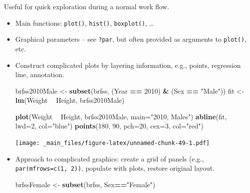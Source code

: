 \documentclass[]{article}
\newenvironment{Shaded}{\begin{snugshade}}{\end{snugshade}}
\newcommand{\KeywordTok}[1]{\textcolor[rgb]{0.13,0.29,0.53}{\textbf{#1}}}
\newcommand{\DataTypeTok}[1]{\textcolor[rgb]{0.13,0.29,0.53}{#1}}
\newcommand{\DecValTok}[1]{\textcolor[rgb]{0.00,0.00,0.81}{#1}}
\newcommand{\StringTok}[1]{\textcolor[rgb]{0.31,0.60,0.02}{#1}}
\newcommand{\OperatorTok}[1]{\textcolor[rgb]{0.81,0.36,0.00}{\textbf{#1}}}
\newcommand{\NormalTok}[1]{#1}
\theoremstyle{definition}
\theoremstyle{definition}
\theoremstyle{remark}
\begin{document}
Useful for quick exploration during a normal work flow.

\begin{itemize}
\item
  Main functions: \texttt{plot()}, \texttt{hist()}, \texttt{boxplot()},
  \ldots{}
\item
  Graphical parameters -- see \texttt{?par}, but often provided as
  arguments to \texttt{plot()}, etc.
\item
  Construct complicated plots by layering information, e.g., points,
  regression line, annotation.

\begin{Shaded}
\begin{Highlighting}[]
\NormalTok{brfss2010Male <-}\StringTok{ }\KeywordTok{subset}\NormalTok{(brfss, (Year }\OperatorTok{==}\StringTok{ }\DecValTok{2010}\NormalTok{) }\OperatorTok{&}\StringTok{ }\NormalTok{(Sex }\OperatorTok{==}\StringTok{ "Male"}\NormalTok{))}
\NormalTok{fit <-}\StringTok{ }\KeywordTok{lm}\NormalTok{(Weight }\OperatorTok{~}\StringTok{ }\NormalTok{Height, brfss2010Male)}

\KeywordTok{plot}\NormalTok{(Weight }\OperatorTok{~}\StringTok{ }\NormalTok{Height, brfss2010Male, }\DataTypeTok{main=}\StringTok{"2010, Males"}\NormalTok{)}
\KeywordTok{abline}\NormalTok{(fit, }\DataTypeTok{lwd=}\DecValTok{2}\NormalTok{, }\DataTypeTok{col=}\StringTok{"blue"}\NormalTok{)}
\KeywordTok{points}\NormalTok{(}\DecValTok{180}\NormalTok{, }\DecValTok{90}\NormalTok{, }\DataTypeTok{pch=}\DecValTok{20}\NormalTok{, }\DataTypeTok{cex=}\DecValTok{3}\NormalTok{, }\DataTypeTok{col=}\StringTok{"red"}\NormalTok{)}
\end{Highlighting}
\end{Shaded}

  \texttt{[image: \_main\_files/figure-latex/unnamed-chunk-49-1.pdf]}
\item
  Approach to complicated graphics: create a grid of panels (e.g.,
  \texttt{par(mfrows=c(1,\ 2))}, populate with plots, restore original
  layout.

\begin{Shaded}
\begin{Highlighting}[]
\NormalTok{brfssFemale <-}\StringTok{ }\KeywordTok{subset}\NormalTok{(brfss, Sex}\OperatorTok{==}\StringTok{"Female"}\NormalTok{)}


\end{Highlighting}
\end{Shaded}
\end{itemize}
\end{document}
